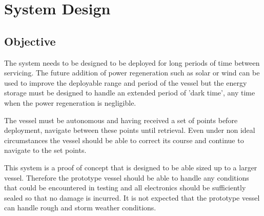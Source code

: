 \section{System Design}
	\subsection{Objective}
	The system needs to be designed to be deployed for long periods of time between servicing. The future addition of power regeneration such as solar or wind can be used to improve the deployable range and period of the vessel but the energy storage must be designed to handle an extended period of 'dark time', any time when the power regeneration is negligible. \par
	The vessel must be autonomous and having received a set of points before deployment, navigate between these points until retrieval. Even under non ideal circumstances the vessel should be able to correct its course and continue to navigate to the set points. \par
	This system is a proof of concept that is designed to be able sized up to a larger vessel. Therefore the prototype vessel should be able to handle any conditions that could be encountered in testing and all electronics should be sufficiently sealed so that no damage is incurred. It is not expected that the prototype vessel can handle rough and storm weather conditions.\par
